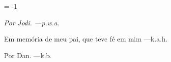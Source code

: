 %




\pageno = -1


% 

\noheadlinetrue\pagebreak


% 
\blankpage

\blankpage


{ }
\noheadlinetrue


% 
\sinkage


{\it \flushright
   Por Jodi.
   ---{\sc p.w.a.}
   
   Em memória de meu pai,
   que teve fé em mim
   ---{\sc k.a.h.}
   
   Por Dan.
   ---{\sc k.b.}
}
\pagebreak



\blankpage
{ }

% 
% 
\rewritetocfilefalse
%
\blankpage

\shortcontents


\ifcompletebook \global\rewritetocfiletrue \fi


\contents

\blankpage
{ }

\byebye
